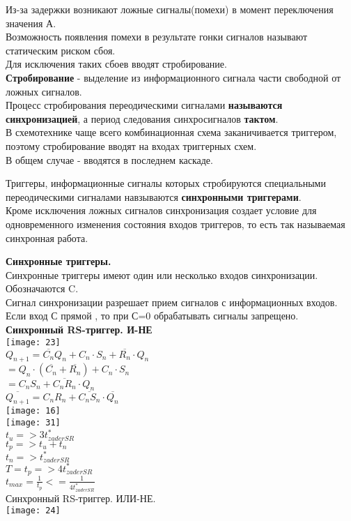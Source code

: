 Из-за задержки возникают ложные сигналы(помехи) в момент переключения значения А.\\
Возможность появления помехи в результате гонки сигналов называют статическим риском сбоя.\\
Для исключения таких сбоев вводят стробирование.\\
\textbf {Стробирование} -  выделение из информационного сигнала части свободной от ложных сигналов.\\
Процесс стробирования переодическими сигналами \textbf {называются синхронизацией},
а период следования синхросигналов \textbf {тактом}. \\

В схемотехнике чаще всего комбинационная схема заканичивается триггером, поэтому стробирование вводят на входах триггерных схем.\\
В общем случае - вводятся в последнем каскаде.

Триггеры, информационные сигналы которых стробируются специальными
переодическими сигналами навзываются \textbf {синхронными триггерами}.\\
Кроме исключения ложных сигналов синхронизация создает условие для одновременного изменения состояния входов триггеров,
то есть так называемая синхронная работа.

\newpage
\textbf {Синхронные триггеры.}\\
Синхронные триггеры имеют один или несколько входов синхронизации. Обозначаются C. \\
Сигнал синхронизации разрешает прием сигналов с информационных входов. \\
Если вход С прямой , то при С=0 обрабатывать сигналы запрещено.\\
\textbf {Синхронный RS-триггер. И-НЕ}\\
\texttt{[image: 23]}\\
$Q_{n+1} = \overline{C_n}Q_n + C_n \cdot S_n + \overline{R_n} \cdot Q_n $\\
\qquad $  = Q_n \cdot (\overline{C_n} + \overline{R_n} ) + C_n \cdot S_n$\\
$ = C_n S_n + \overline{C_n R_n} \cdot Q_n$\\
$\overline{Q_{n+1}} = C_n R_n + \overline{C_n S_n} \cdot \overline{Q_n}$\\
\texttt{[image: 16]}\\
\newpage
\texttt{[image: 31]}\\

$t_{u} => 3t^*_{zaderSR}$\\
$t_{p} => t_u + t_n $\\
$t_{n} => t^*_{zaderSR}$\\
$T = t_p => 4t^*_{zaderSR} $\\
$t_{max} = \frac{1}{t_p} <= \frac{1}{ 4t^*_{zaderSR}} $\\
Синхронный RS-триггер. ИЛИ-НЕ. \\
\texttt{[image: 24]}\\



